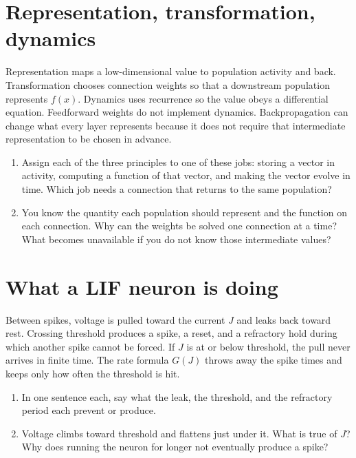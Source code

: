 \documentclass[11pt,letterpaper]{article}
\begin{document}
\section{Representation, transformation, dynamics}

\begin{idea}
Representation maps a low-dimensional value to population activity and back. Transformation chooses connection weights so that a downstream population represents \(f(x)\). Dynamics uses recurrence so the value obeys a differential equation. Feedforward weights do not implement dynamics. Backpropagation can change what every layer represents because it does not require that intermediate representation to be chosen in advance.
\end{idea}

\begin{enumerate}
\item Assign each of the three principles to one of these jobs: storing a vector in activity, computing a function of that vector, and making the vector evolve in time. Which job needs a connection that returns to the same population?
\item You know the quantity each population should represent and the function on each connection. Why can the weights be solved one connection at a time? What becomes unavailable if you do not know those intermediate values?
\end{enumerate}

\section{What a LIF neuron is doing}

\begin{idea}
Between spikes, voltage is pulled toward the current \(J\) and leaks back toward rest. Crossing threshold produces a spike, a reset, and a refractory hold during which another spike cannot be forced. If \(J\) is at or below threshold, the pull never arrives in finite time. The rate formula \(G(J)\) throws away the spike times and keeps only how often the threshold is hit.
\end{idea}

\begin{enumerate}
\item In one sentence each, say what the leak, the threshold, and the refractory period each prevent or produce.
\item Voltage climbs toward threshold and flattens just under it. What is true of \(J\)? Why does running the neuron for longer not eventually produce a spike?
\end{enumerate}
\end{document}
